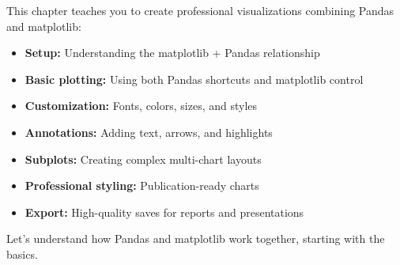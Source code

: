 \begin{tcolorbox}[title=Focus of this chapter:,colframe=orange,colback=white,arc=2mm]
This chapter teaches you to create professional visualizations combining Pandas and matplotlib:
\begin{itemize}
\item \textbf{Setup:} Understanding the matplotlib + Pandas relationship
\item \textbf{Basic plotting:} Using both Pandas shortcuts and matplotlib control
\item \textbf{Customization:} Fonts, colors, sizes, and styles
\item \textbf{Annotations:} Adding text, arrows, and highlights
\item \textbf{Subplots:} Creating complex multi-chart layouts
\item \textbf{Professional styling:} Publication-ready charts
\item \textbf{Export:} High-quality saves for reports and presentations
\end{itemize}
\end{tcolorbox}



Let's understand how Pandas and matplotlib work together, starting with the basics.

